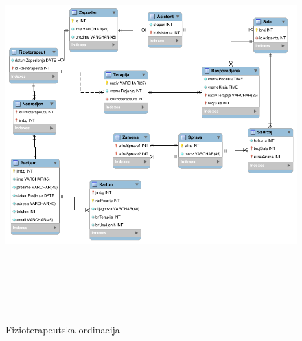 \documentclass{article}
\begin{document}
\newpage
\begin{figure}[H]
	\centering
	\includegraphics[width=15cm,height=15cm,keepaspectratio]{dijagram.png}
	\caption{Fizioterapeutska ordinacija}
	\label{fig:dijagram}
\end{figure}
\end{document}
